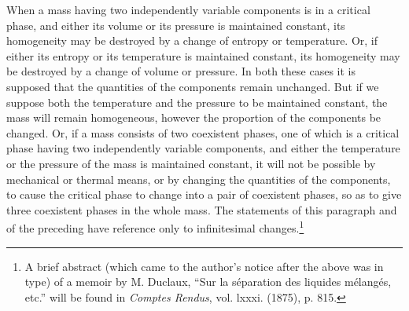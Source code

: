 \documentclass[11pt]{article}
\newcommand{\symfootnote}[2]{\begingroup\renewcommand{\thefootnote}{#1}\footnote{#2}\endgroup}
\begin{document}
When a mass having two independently variable components is in a critical phase, and either its volume or its pressure is maintained constant, its homogeneity may be destroyed by a change of entropy or temperature. Or, if either its entropy or its temperature is maintained constant, its homogeneity may be destroyed by a change of volume or pressure. In both these cases it is supposed that the quantities of the components remain unchanged. But if we suppose both the temperature and the pressure to be maintained constant, the mass will remain homogeneous, however the proportion of the components be changed. Or, if a mass consists of two coexistent phases, one of which is a critical phase having two independently variable components, and either the temperature or the pressure of the mass is maintained constant, it will not be possible by mechanical or thermal means, or by changing the quantities of the components, to cause the critical phase to change into a pair of coexistent phases, so as to give three coexistent phases in the whole mass. The statements of this paragraph and of the preceding have reference only to infinitesimal changes.\symfootnote{*}{A brief abstract (which came to the author's notice after the above was in type) of a memoir by M. Duclaux, ``Sur la séparation des liquides mélangés, etc.'' will be found in \textit{Comptes Rendus}, vol. lxxxi. (1875), p. 815.}
\end{document}
